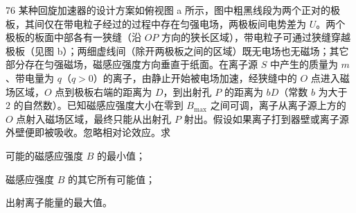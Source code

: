 \begin{problem}[第34届物理竞赛复赛][回旋加速器]{76}
    某种回旋加速器的设计方案如俯视图 a 所示，图中粗黑线段为两个正对的极板，其间仅在带电粒子经过的过程中存在匀强电场，两极板间电势差为 $U$。两个极板的板面中部各有一狭缝（沿 $OP$ 方向的狭长区域），带电粒子可通过狭缝穿越极板（见图 b）；两细虚线间（除开两极板之间的区域）既无电场也无磁场；其它部分存在匀强磁场，磁感应强度方向垂直于纸面。在离子源 $S$ 中产生的质量为 $m$、带电量为 $q$（$q > 0$）的离子，由静止开始被电场加速，经狭缝中的 $O$ 点进入磁场区域，$O$ 点到极板右端的距离为 $D$，到出射孔 $P$ 的距离为 $bD$（常数 $b$ 为大于 $2$ 的自然数）。已知磁感应强度大小在零到 $B_{\max}$ 之间可调，离子从离子源上方的 $O$ 点射入磁场区域，最终只能从出射孔 $P$ 射出。假设如果离子打到器壁或离子源外壁便即被吸收。忽略相对论效应。求
    \begin{subproblem}
        可能的磁感应强度 $B$ 的最小值；
    \end{subproblem}
    \begin{subproblem}
        磁感应强度 $B$ 的其它所有可能值；
    \end{subproblem}
    \begin{subproblem}
        出射离子能量的最大值。
    \end{subproblem}
\end{problem}